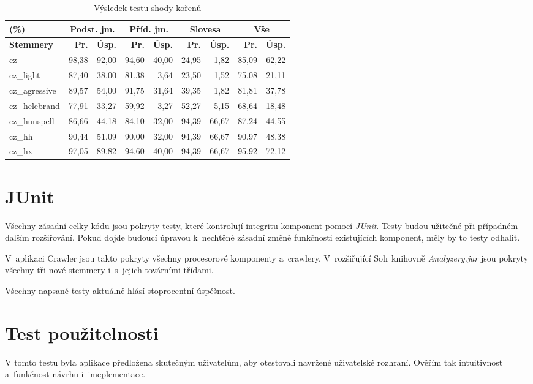 \begin{table}
\begin{center}
\begin{tabular}{|l|r|r|r|r|r|r|r|r|}
\hline
(\%) & \multicolumn{2}{|c|}{\textbf{Podst. jm.}} & \multicolumn{2}{|c|}{\textbf{Příd. jm.}} & \multicolumn{2}{|c|}{\textbf{Slovesa}} & \multicolumn{2}{|c|}{\textbf{Vše}} \\ \hline
\textbf{Stemmery} & \textbf{Pr.} & \textbf{Úsp.} & \textbf{Pr.} & \textbf{Úsp.} & \textbf{Pr.} & \textbf{Úsp.} & \textbf{Pr.} & \textbf{Úsp.} \\ \hline
cz & 98,38 & 92,00 & 94,60 & 40,00 & 24,95 & 1,82 & 85,09 & 62,22 \\ \hline
cz\_light & 87,40 & 38,00 & 81,38 & 3,64 & 23,50 & 1,52 & 75,08 & 21,11 \\ \hline
cz\_agressive & 89,57 & 54,00 & 91,75 & 31,64 & 39,35 & 1,82 & 81,81 & 37,78 \\ \hline
cz\_helebrand & 77,91 & 33,27 & 59,92 & 3,27 & 52,27 & 5,15 & 68,64 & 18,48 \\ \hline
cz\_hunspell & 86,66 & 44,18 & 84,10 & 32,00 & 94,39 & 66,67 & 87,24 & 44,55 \\ \hline
\hline
cz\_hh & 90,44 & 51,09 & 90,00 & 32,00 & 94,39 & 66,67 & 90,97 & 48,38 \\ \hline
cz\_hx & 97,05 & 89,82 & 94,60 & 40,00 & 94,39 & 66,67 & 95,92 & 72,12 \\ \hline
\end{tabular}
\end{center}
\caption{Výsledek testu shody kořenů}
\label{tab:test_eql}
\end{table}

\section{JUnit}
Všechny zásadní celky kódu jsou pokryty testy, které kontrolují integritu komponent pomocí \emph{JUnit}. Testy budou užitečné při případném dalším rozšiřování. Pokud dojde budoucí úpravou k~nechtěné zásadní změně funkčnosti existujících komponent, měly by to testy odhalit.

V~aplikaci Crawler jsou takto pokryty všechny procesorové komponenty a~crawlery. V~rozšiřující Solr knihovně \emph{Analyzery.jar} jsou pokryty všechny tři nové stemmery i~s~jejich továrními třídami.

Všechny napsané testy aktuálně hlásí stoprocentní úspěšnost.

\section{Test použitelnosti}
V tomto testu byla aplikace předložena skutečným uživatelům, aby otestovali navržené uživatelské rozhraní. Ověřím tak intuitivnost a~funkčnost návrhu i~imeplementace.

